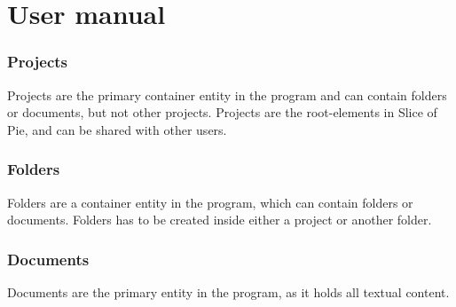 \section{User manual}
\subsubsection{Projects}
Projects are the primary container entity in the program and can contain folders or documents, but not other projects.
Projects are the root-elements in Slice of Pie, and can be shared with other users.

\subsubsection{Folders}
Folders are a container entity in the program, which can contain folders or documents. Folders has to be created inside either a project or another folder.

\subsubsection{Documents}
Documents are the primary entity in the program, as it holds all textual content.




